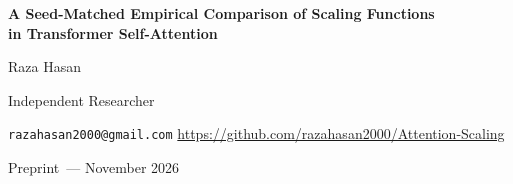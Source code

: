 \documentclass[11pt,a4paper]{article}
\begin{document}
\begin{center}
  {\LARGE\bfseries A Seed-Matched Empirical Comparison of Scaling Functions\\[3pt]
   in Transformer Self-Attention\par}
  \vspace{14pt}
  {\large Raza Hasan\par}
  \vspace{3pt}
  {\small Independent Researcher\par}
  \vspace{2pt}
  {\small\texttt{razahasan2000@gmail.com} \;\textperiodcentered\;
         \url{https://github.com/razahasan2000/Attention-Scaling}\par}
  \vspace{8pt}
  {\small Preprint~--- November 2026\par}
\end{center}
\vspace{6pt}
\end{document}
